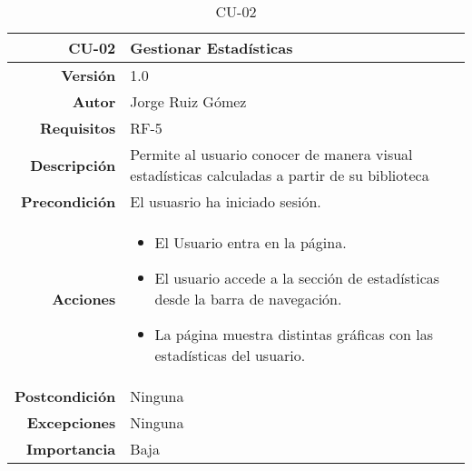 \begin{table}[]
\centering
\begin{tabular}{r|p{}}
\hline
\textbf{CU-02}         & \textbf{Gestionar Estadísticas}                                 \\ \hline
\textbf{Versión}       & 1.0                                                     \\
\textbf{Autor}         & Jorge Ruiz Gómez                                        \\
\textbf{Requisitos}    & RF-5                                         \\
\textbf{Descripción}   & Permite al usuario conocer de manera visual estadísticas calculadas a partir de su biblioteca \\ \hline
\textbf{Precondición}  & El usuasrio ha iniciado sesión.                                              \\
\textbf{Acciones}      &    \begin{itemize}
                                \item El Usuario entra en la página.
                                \item El usuario accede a la sección de estadísticas desde la barra de navegación.
                                \item La página muestra distintas gráficas con las estadísticas del usuario. 

                            \end{itemize}\\
                                                                          
\textbf{Postcondición} & Ninguna                              \\
\textbf{Excepciones}   & Ninguna                                                 \\
\textbf{Importancia}   & Baja                                                    \\ \hline
\end{tabular}
\caption{CU-02}
\label{tab:my-table}
\end{table}


